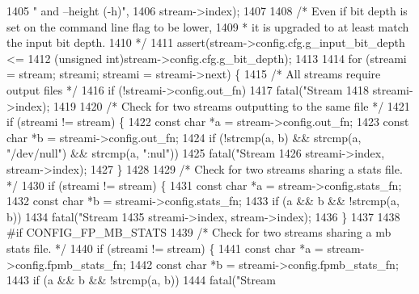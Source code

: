 \begin{DoxyCodeInclude}
{{{{{{{{{{{{{{{{{{{{1405         \textcolor{stringliteral}{" and --height (-h)"},
1406         stream->index);
1407 
1408   \textcolor{comment}{/* Even if bit depth is set on the command line flag to be lower,}
1409 \textcolor{comment}{   * it is upgraded to at least match the input bit depth.}
1410 \textcolor{comment}{   */}
1411   assert(stream->config.cfg.g\_input\_bit\_depth <=
1412       (\textcolor{keywordtype}{unsigned} \textcolor{keywordtype}{int})stream->config.cfg.g\_bit\_depth);
1413 
1414   \textcolor{keywordflow}{for} (streami = stream; streami; streami = streami->next) \{
1415     \textcolor{comment}{/* All streams require output files */}
1416     \textcolor{keywordflow}{if} (!streami->config.out\_fn)
1417       fatal(\textcolor{stringliteral}{"Stream %
1418           streami->index);
1419 
1420     \textcolor{comment}{/* Check for two streams outputting to the same file */}
1421     \textcolor{keywordflow}{if} (streami != stream) \{
1422       \textcolor{keyword}{const} \textcolor{keywordtype}{char} *a = stream->config.out\_fn;
1423       \textcolor{keyword}{const} \textcolor{keywordtype}{char} *b = streami->config.out\_fn;
1424       \textcolor{keywordflow}{if} (!strcmp(a, b) && strcmp(a, \textcolor{stringliteral}{"/dev/null"}) && strcmp(a, \textcolor{stringliteral}{":nul"}))
1425         fatal(\textcolor{stringliteral}{"Stream %
1426             streami->index, stream->index);
1427     \}
1428 
1429     \textcolor{comment}{/* Check for two streams sharing a stats file. */}
1430     \textcolor{keywordflow}{if} (streami != stream) \{
1431       \textcolor{keyword}{const} \textcolor{keywordtype}{char} *a = stream->config.stats\_fn;
1432       \textcolor{keyword}{const} \textcolor{keywordtype}{char} *b = streami->config.stats\_fn;
1433       \textcolor{keywordflow}{if} (a && b && !strcmp(a, b))
1434         fatal(\textcolor{stringliteral}{"Stream %
1435             streami->index, stream->index);
1436     \}
1437 
1438 \textcolor{preprocessor}{#if CONFIG\_FP\_MB\_STATS}
1439     \textcolor{comment}{/* Check for two streams sharing a mb stats file. */}
1440     \textcolor{keywordflow}{if} (streami != stream) \{
1441       \textcolor{keyword}{const} \textcolor{keywordtype}{char} *a = stream->config.fpmb\_stats\_fn;
1442       \textcolor{keyword}{const} \textcolor{keywordtype}{char} *b = streami->config.fpmb\_stats\_fn;
1443       \textcolor{keywordflow}{if} (a && b && !strcmp(a, b))
1444         fatal(\textcolor{stringliteral}{"Stream %
}}}}}}}}}}}}}}}}}}}}}}}}
\end{DoxyCodeInclude}
